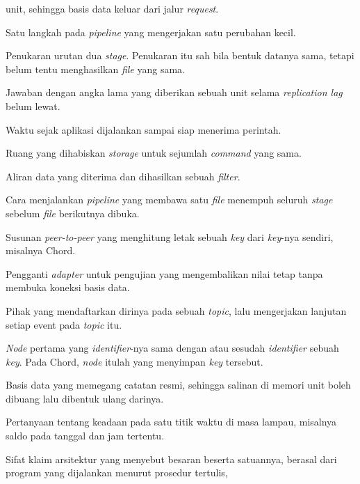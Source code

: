 \begin{description}
{    unit}, sehingga basis data keluar dari jalur \textit{request}.
  \item[\textit{Stage}] Satu langkah pada \textit{pipeline} yang mengerjakan
    satu perubahan kecil.
  \item[\textit{Stage reordering}] Penukaran urutan dua \textit{stage}.
    Penukaran itu sah bila bentuk datanya sama, tetapi belum tentu menghasilkan
    \textit{file} yang sama.
  \item[\textit{Stale read}] Jawaban dengan angka lama yang diberikan sebuah unit
    selama \textit{replication lag} belum lewat.
  \item[\textit{Startup time}] Waktu sejak aplikasi dijalankan sampai siap
    menerima perintah.
  \item[\textit{Storage cost}] Ruang yang dihabiskan \textit{storage} untuk
    sejumlah \textit{command} yang sama.
  \item[\textit{Stream}] Aliran data yang diterima dan dihasilkan sebuah
    \textit{filter}.
  \item[\textit{Streaming}] Cara menjalankan \textit{pipeline} yang membawa satu
    \textit{file} menempuh seluruh \textit{stage} sebelum \textit{file}
    berikutnya dibuka.
  \item[\textit{Structured}] Susunan \textit{peer-to-peer} yang menghitung letak
    sebuah \textit{key} dari \textit{key}-nya sendiri, misalnya Chord.
  \item[\textit{Stub}] Pengganti \textit{adapter} untuk pengujian yang
    mengembalikan nilai tetap tanpa membuka koneksi basis data.
  \item[\textit{Subscriber}] Pihak yang mendaftarkan dirinya pada sebuah
    \textit{topic}, lalu mengerjakan lanjutan setiap event pada \textit{topic}
    itu.
  \item[\textit{Successor}] \textit{Node} pertama yang \textit{identifier}-nya
    sama dengan atau sesudah \textit{identifier} sebuah \textit{key}. Pada
    Chord, \textit{node} itulah yang menyimpan \textit{key} tersebut.
  \item[\textit{System of record}] Basis data yang memegang catatan resmi,
    sehingga salinan di memori unit boleh dibuang lalu dibentuk ulang darinya.
  \item[\textit{Temporal query}] Pertanyaan tentang keadaan pada satu titik
    waktu di masa lampau, misalnya saldo pada tanggal dan jam tertentu.
  \item[Terukur] Sifat klaim arsitektur yang menyebut besaran beserta
    satuannya, berasal dari program yang dijalankan menurut prosedur tertulis,

\end{description}
